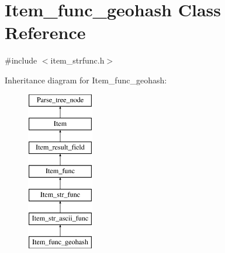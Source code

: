 \hypertarget{classItem__func__geohash}{}\section{Item\+\_\+func\+\_\+geohash Class Reference}
\label{classItem__func__geohash}


{\ttfamily \#include $<$item\+\_\+strfunc.\+h$>$}

Inheritance diagram for Item\+\_\+func\+\_\+geohash\+:\begin{figure}[H]
\begin{center}
\leavevmode
\includegraphics[height=7.000000cm]{classItem__func__geohash}
\end{center}
\end{figure}
